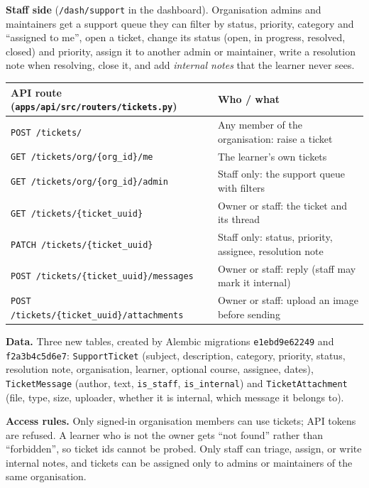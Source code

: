 \documentclass[11pt,a4paper]{article}
\newcommand{\fp}[1]{\nolinkurl{#1}}
\begin{document}
\textbf{Staff side} (\texttt{/dash/support} in the dashboard). Organisation admins and maintainers get a
support queue they can filter by status, priority, category and ``assigned to me'', open a ticket, change its status
(open, in progress, resolved, closed) and priority, assign it to another admin or maintainer, write a
resolution note when resolving, close it, and add \emph{internal notes} that the learner never sees.

\begin{xltabular}{\textwidth}{L{0.42\textwidth}Y}
\toprule
\textbf{API route} (\fp{apps/api/src/routers/tickets.py}) & \textbf{Who / what} \\
\midrule
\texttt{POST /tickets/} & Any member of the organisation: raise a ticket \\
\texttt{GET /tickets/org/\{org\_id\}/me} & The learner's own tickets \\
\texttt{GET /tickets/org/\{org\_id\}/admin} & Staff only: the support queue with filters \\
\texttt{GET /tickets/\{ticket\_uuid\}} & Owner or staff: the ticket and its thread \\
\texttt{PATCH /tickets/\{ticket\_uuid\}} & Staff only: status, priority, assignee, resolution note \\
\texttt{POST /tickets/\{ticket\_uuid\}/messages} & Owner or staff: reply (staff may mark it internal) \\
\texttt{POST /tickets/\{ticket\_uuid\}/attachments} & Owner or staff: upload an image before sending \\
\bottomrule
\end{xltabular}

\textbf{Data.} Three new tables, created by Alembic migrations \texttt{e1ebd9e62249} and
\texttt{f2a3b4c5d6e7}: \texttt{SupportTicket} (subject, description, category, priority, status,
resolution note, organisation, learner, optional course, assignee, dates), \texttt{TicketMessage}
(author, text, \texttt{is\_staff}, \texttt{is\_internal}) and \texttt{TicketAttachment} (file, type,
size, uploader, whether it is internal, which message it belongs to).

\textbf{Access rules.} Only signed-in organisation members can use tickets; API tokens are refused. A
learner who is not the owner gets ``not found'' rather than ``forbidden'', so ticket ids cannot be
probed. Only staff can triage, assign, or write internal notes, and tickets can be assigned only to
admins or maintainers of the same organisation.
\end{document}
